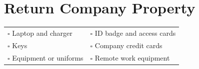 
\section{Return Company Property}
\label{sec:return}

\begin{tabular}{p{9cm} p{8cm}}
$\square$ Laptop and charger & $\square$ ID badge and access cards \\ 
$\square$ Keys & $\square$ Company credit cards \\ 
$\square$ Equipment or uniforms & $\square$ Remote work equipment \\ 
\end{tabular}


